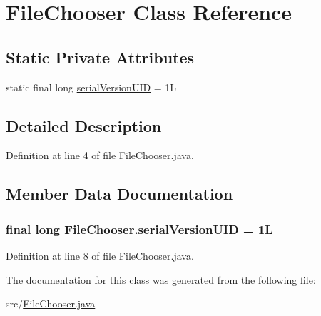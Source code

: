 \hypertarget{class_file_chooser}{\section{File\-Chooser Class Reference}
\label{class_file_chooser}
}
\subsection*{Static Private Attributes}
\begin{DoxyCompactItemize}
\item 
static final long \hyperlink{class_file_chooser_a3cbd18488adfa238990fc2faf44a2931}{serial\-Version\-U\-I\-D} = 1\-L
\begin{DoxyCompactList}\small\item\em \begin{DoxyVerb}      \end{DoxyVerb}
 \end{DoxyCompactList}\end{DoxyCompactItemize}


\subsection{Detailed Description}


Definition at line 4 of file File\-Chooser.\-java.



\subsection{Member Data Documentation}
\hypertarget{class_file_chooser_a3cbd18488adfa238990fc2faf44a2931}{
\subsubsection[{serial\-Version\-U\-I\-D}]{\setlength{\rightskip}{0pt plus 5cm}final long {\bf File\-Chooser.\-serial\-Version\-U\-I\-D} = 1\-L}}\label{class_file_chooser_a3cbd18488adfa238990fc2faf44a2931}


\begin{DoxyVerb}      \end{DoxyVerb}
 



Definition at line 8 of file File\-Chooser.\-java.



The documentation for this class was generated from the following file\-:\begin{DoxyCompactItemize}
\item 
src/\hyperlink{_file_chooser_8java}{File\-Chooser.\-java}\end{DoxyCompactItemize}
